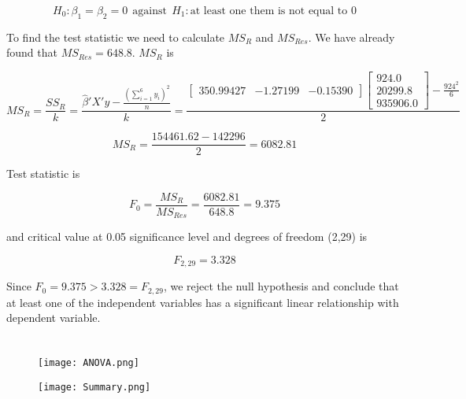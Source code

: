 \documentclass{article}
\begin{document}
\begin{equation}
    H_0: \beta_1 = \beta_2 = 0 \ \ \text{against} \ \ H_1: \text{at least one them is not equal to 0}
\end{equation}

To find the test statistic we need to calculate $MS_R$ and $MS_{Res}$. We have already found that $MS_{Res} = 648.8$. $MS_R$ is 

\begin{equation}
    MS_R = \frac{SS_R}{k} = \frac{\hat{\beta}'X'y - \frac{(\sum_{i=1}^{6}y_i)^2}{n}
}{k} = \frac{\begin{bmatrix}
    350.99427 & -1.27199 &  -0.15390
    \end{bmatrix} 
    \begin{bmatrix} 
    924.0 \\
    20299.8 \\
    935906.0
    \end{bmatrix} - \frac{924^2}{6}}{2}
\end{equation}

\begin{equation}
    MS_R = \frac{154461.62 - 142296}{2} = 6082.81
\end{equation}

Test statistic is

\begin{equation}
    F_0 = \frac{MS_R}{MS_{Res}} = \frac{6082.81}{648.8} =  9.375
\end{equation}

and critical value at 0.05 significance level and degrees of freedom (2,29) is 

\begin{equation}
    F_{2,29} = 3.328
\end{equation}

Since $F_0 = 9.375 > 3.328 = F_{2,29}$, we reject the null hypothesis and conclude that at least one of the independent variables has a significant linear relationship with dependent variable.

\section{}

\begin{figure}[h]
\centering
\texttt{[image: ANOVA.png]}
\end{figure}

\begin{figure}[h]
\centering
\texttt{[image: Summary.png]}
\end{figure}
\end{document}
